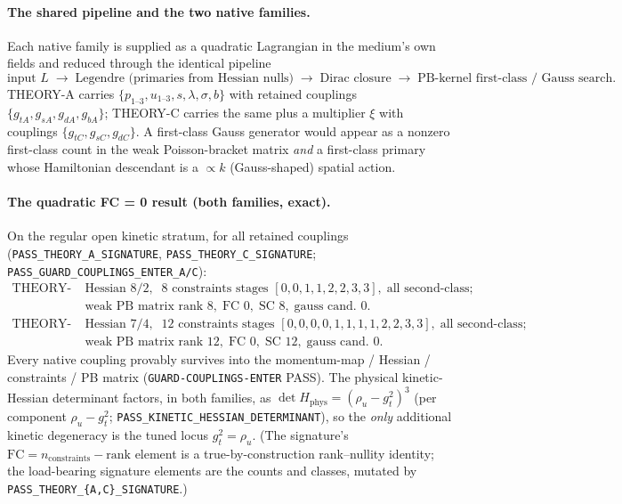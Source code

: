 \paragraph{The shared pipeline and the two native families.}
Each native family is supplied as a quadratic Lagrangian in the medium's own
fields and reduced through the identical pipeline
\[
  \text{input }L \;\to\; \text{Legendre (primaries from Hessian nulls)}
  \;\to\; \text{Dirac closure} \;\to\; \text{PB-kernel first-class / Gauss search.}
\]
THEORY-A carries \(\{p_{1\text{--}3},u_{1\text{--}3},s,\lambda,\sigma,b\}\) with
retained couplings \(\{g_{tA},g_{sA},g_{dA},g_{bA}\}\); THEORY-C carries the same
plus a multiplier \(\xi\) with couplings \(\{g_{tC},g_{sC},g_{dC}\}\). A first-class
Gauss generator would appear as a nonzero first-class count in the weak
Poisson-bracket matrix \emph{and} a first-class primary whose Hamiltonian
descendant is a \(\propto k\) (Gauss-shaped) spatial action.

\paragraph{The quadratic FC = 0 result (both families, exact).}
On the regular open kinetic stratum, for all retained couplings
(\texttt{PASS\_THEORY\_A\_SIGNATURE}, \texttt{PASS\_THEORY\_C\_SIGNATURE};
\texttt{PASS\_GUARD\_COUPLINGS\_ENTER\_A/C}):
\[
  \begin{aligned}
  \text{THEORY-A:}\;&\text{Hessian }8/2,\;\;8\text{ constraints stages }[0,0,1,1,2,2,3,3],\;
    \text{all second-class};\\
   &\text{weak PB matrix rank }8,\;\text{FC }0,\;\text{SC }8,\;\text{gauss cand. }0.\\
  \text{THEORY-C:}\;&\text{Hessian }7/4,\;\;12\text{ constraints stages }[0,0,0,0,1,1,1,1,2,2,3,3],\;
    \text{all second-class};\\
   &\text{weak PB matrix rank }12,\;\text{FC }0,\;\text{SC }12,\;\text{gauss cand. }0.
  \end{aligned}
\]
Every native coupling provably survives into the momentum-map / Hessian /
constraints / PB matrix (\texttt{GUARD-COUPLINGS-ENTER} PASS). The physical
kinetic-Hessian determinant factors, in both families, as
\(\det H_{\mathrm{phys}}=(\rho_u-g_t^2)^3\) (per component \(\rho_u-g_t^2\);
\texttt{PASS\_KINETIC\_HESSIAN\_DETERMINANT}), so the \emph{only} additional
kinetic degeneracy is the tuned locus \(g_t^2=\rho_u\). (The signature's
\(\mathrm{FC}=n_{\mathrm{constraints}}-\mathrm{rank}\) element is a
true-by-construction rank--nullity identity; the load-bearing signature elements
are the counts and classes, mutated by \texttt{PASS\_THEORY\_\{A,C\}\_SIGNATURE}.)

